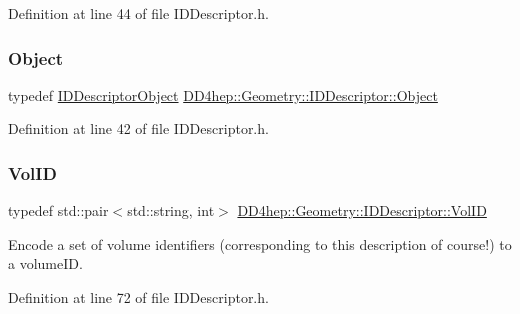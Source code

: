 Definition at line 44 of file I\+D\+Descriptor.\+h.

\hypertarget{class_d_d4hep_1_1_geometry_1_1_i_d_descriptor_a798e1c3f32519c2161daa79a7c842279}{}\label{class_d_d4hep_1_1_geometry_1_1_i_d_descriptor_a798e1c3f32519c2161daa79a7c842279} 
\subsubsection{\texorpdfstring{Object}{Object}}
{\footnotesize\ttfamily typedef \hyperlink{class_d_d4hep_1_1_geometry_1_1_i_d_descriptor_object}{I\+D\+Descriptor\+Object} \hyperlink{class_d_d4hep_1_1_geometry_1_1_i_d_descriptor_a798e1c3f32519c2161daa79a7c842279}{D\+D4hep\+::\+Geometry\+::\+I\+D\+Descriptor\+::\+Object}}



Definition at line 42 of file I\+D\+Descriptor.\+h.

\hypertarget{class_d_d4hep_1_1_geometry_1_1_i_d_descriptor_a6928b7adb965c1c276f22f62a0633750}{}\label{class_d_d4hep_1_1_geometry_1_1_i_d_descriptor_a6928b7adb965c1c276f22f62a0633750} 
\subsubsection{\texorpdfstring{Vol\+ID}{VolID}}
{\footnotesize\ttfamily typedef std\+::pair$<$std\+::string, int$>$ \hyperlink{class_d_d4hep_1_1_geometry_1_1_i_d_descriptor_a6928b7adb965c1c276f22f62a0633750}{D\+D4hep\+::\+Geometry\+::\+I\+D\+Descriptor\+::\+Vol\+ID}}



Encode a set of volume identifiers (corresponding to this description of course!) to a volume\+ID. 



Definition at line 72 of file I\+D\+Descriptor.\+h.

\hypertarget{class_d_d4hep_1_1_geometry_1_1_i_d_descriptor_a29eabc3d9c0c0cfdc01c18e915114a71}{}\label{class_d_d4hep_1_1_geometry_1_1_i_d_descriptor_a29eabc3d9c0c0cfdc01c18e915114a71} 
